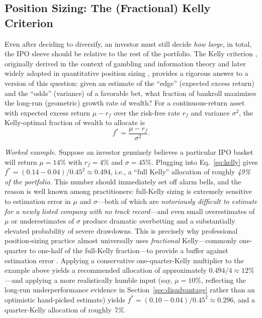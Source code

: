 \documentclass[conference]{IEEEtran}
\begin{document}
\subsection{Position Sizing: The (Fractional) Kelly Criterion}

Even after deciding to diversify, an investor must still decide \emph{how large}, in total, the IPO sleeve should be relative to the rest of the portfolio. The Kelly criterion \cite{kelly1956}, originally derived in the context of gambling and information theory and later widely adopted in quantitative position sizing \cite{bodiekanemarcus}, provides a rigorous answer to a version of this question: given an estimate of the ``edge'' (expected excess return) and the ``odds'' (variance) of a favorable bet, what fraction of bankroll maximizes the long-run (geometric) growth rate of wealth? For a continuous-return asset with expected excess return $\mu - r_f$ over the risk-free rate $r_f$ and variance $\sigma^2$, the Kelly-optimal fraction of wealth to allocate is
\begin{equation}
f^{*} = \frac{\mu - r_f}{\sigma^2}.
\label{eq:kelly}
\end{equation}

\noindent\textit{Worked example.} Suppose an investor genuinely believes a particular IPO basket will return $\mu = 14\%$ with $r_f = 4\%$ and $\sigma = 45\%$. Plugging into Eq.~\eqref{eq:kelly} gives $f^{*} = (0.14 - 0.04)/0.45^2 \approx 0.494$, i.e., a ``full Kelly'' allocation of roughly \emph{49\% of the portfolio}. This number should immediately set off alarm bells, and the reason is well known among practitioners: full-Kelly sizing is extremely sensitive to estimation error in $\mu$ and $\sigma$---both of which are \emph{notoriously difficult to estimate for a newly listed company with no track record}---and even small overestimates of $\mu$ or underestimates of $\sigma$ produce dramatic overbetting and a substantially elevated probability of severe drawdowns. This is precisely why professional position-sizing practice almost universally uses \emph{fractional} Kelly---commonly one-quarter to one-half of the full-Kelly fraction---to provide a buffer against estimation error \cite{bodiekanemarcus}. Applying a conservative one-quarter-Kelly multiplier to the example above yields a recommended allocation of approximately $0.494/4 \approx 12\%$---and applying a more realistically humble input (say, $\mu = 10\%$, reflecting the long-run underperformance evidence in Section~\ref{sec:disadvantage} rather than an optimistic hand-picked estimate) yields $f^* = (0.10-0.04)/0.45^2 \approx 0.296$, and a quarter-Kelly allocation of roughly \emph{7\%}.
\end{document}
